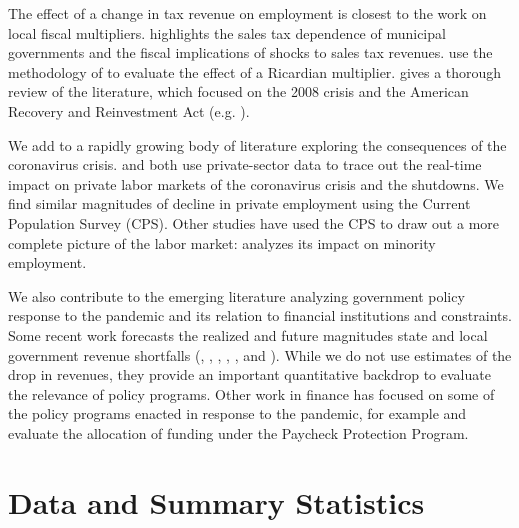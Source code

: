 The effect of a change in tax revenue on employment is closest to the work on local fiscal multipliers. \cite{Schoag2017} highlights the sales tax dependence of municipal governments and the fiscal implications of shocks to sales tax revenues. \cite{ClemensMiran:2012:LocalFiscalMult} use the methodology of \cite{Poterba:1994:FiscalCrises} to evaluate the effect of a Ricardian multiplier.
\cite{Chodorow:2019:CSMultipliers} gives a thorough review of the literature, which focused on the 2008 crisis and the American Recovery and Reinvestment Act (e.g. \cite{Chodorow_al:2012:StateFiscal,Wilson:2012:LocalMultiplier,Shoag:2013:StatePension,SuarezWingender:2016:LocalMultiplier}).

We add to a rapidly growing body of literature exploring the consequences of the coronavirus crisis. 
\cite{Cajner_al:2020:LaborCovid} and \cite{Kahn_al:2020:LaborCovid} both use private-sector data to trace out the real-time impact on private labor markets of the coronavirus crisis and the shutdowns. 
We find similar magnitudes of decline in private employment using the Current Population Survey (CPS).
Other studies have used the CPS to draw out a more complete picture of the labor market: \citet{Fairlie_al:2020:C19MinorityEmp} analyzes its impact on minority employment.

We also contribute to the emerging literature analyzing government policy response to the pandemic and its relation to financial institutions and constraints. 
Some recent work forecasts the realized and future magnitudes state and local government revenue shortfalls (\cite{McNichol:2020:StateShortfallEstimate}, \cite{ClemensVeuger:2020:StateCovid}, \cite{Chernick_al:2020:CovidCities}, \cite{Gordon_al:2020:StateLocalCovid}, \cite{GordonReber:2020:SchoolDistrict}, and \cite{Whitaker:2020:LocalGovHelp}). 
While we do not use estimates of the drop in revenues, they provide an important quantitative backdrop to evaluate the relevance of policy programs.
Other work in finance has focused on some of the policy programs enacted in response to the pandemic, for example \cite{GMYZ_PPP} and \cite{Liebersohn2020} evaluate the allocation of funding under the Paycheck Protection Program. 


\section{Data and Summary Statistics}
\label{sec:data}

